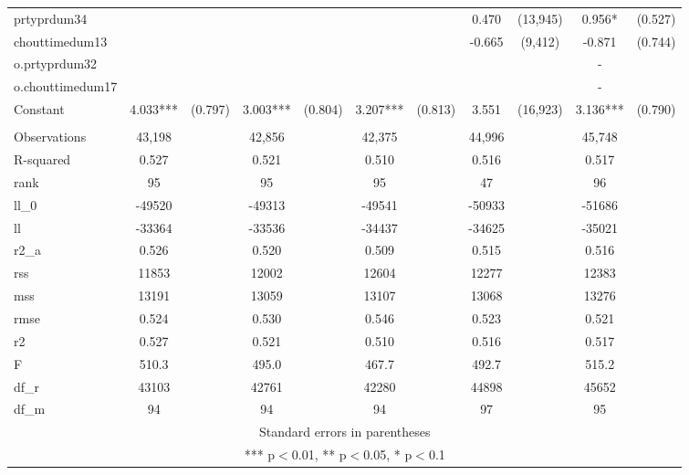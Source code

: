 \documentclass[]{article}
\begin{document}
\begin{tabular}{lcccccccccc}
prtyprdum34 &  &  &  &  &  &  & 0.470 & (13,945) & 0.956* & (0.527) \\
chouttimedum13 &  &  &  &  &  &  & -0.665 & (9,412) & -0.871 & (0.744) \\
o.prtyprdum32 &  &  &  &  &  &  &  &  & - &  \\
o.chouttimedum17 &  &  &  &  &  &  &  &  & - &  \\
Constant & 4.033*** & (0.797) & 3.003*** & (0.804) & 3.207*** & (0.813) & 3.551 & (16,923) & 3.136*** & (0.790) \\
 &  &  &  &  &  &  &  &  &  &  \\
Observations & 43,198 &  & 42,856 &  & 42,375 &  & 44,996 &  & 45,748 &  \\
R-squared & 0.527 &  & 0.521 &  & 0.510 &  & 0.516 &  & 0.517 &  \\
rank & 95 &  & 95 &  & 95 &  & 47 &  & 96 &  \\
ll\_0 & -49520 &  & -49313 &  & -49541 &  & -50933 &  & -51686 &  \\
ll & -33364 &  & -33536 &  & -34437 &  & -34625 &  & -35021 &  \\
r2\_a & 0.526 &  & 0.520 &  & 0.509 &  & 0.515 &  & 0.516 &  \\
rss & 11853 &  & 12002 &  & 12604 &  & 12277 &  & 12383 &  \\
mss & 13191 &  & 13059 &  & 13107 &  & 13068 &  & 13276 &  \\
rmse & 0.524 &  & 0.530 &  & 0.546 &  & 0.523 &  & 0.521 &  \\
r2 & 0.527 &  & 0.521 &  & 0.510 &  & 0.516 &  & 0.517 &  \\
F & 510.3 &  & 495.0 &  & 467.7 &  & 492.7 &  & 515.2 &  \\
df\_r & 43103 &  & 42761 &  & 42280 &  & 44898 &  & 45652 &  \\
 df\_m & 94 &  & 94 &  & 94 &  & 97 &  & 95 &  \\ \hline
\multicolumn{11}{c}{ Standard errors in parentheses} \\
\multicolumn{11}{c}{ *** p$<$0.01, ** p$<$0.05, * p$<$0.1} \\
\end{tabular}
\end{document}
